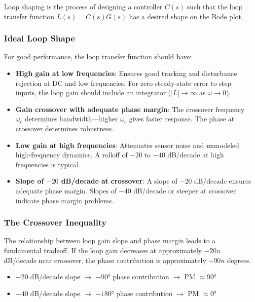 Loop shaping is the process of designing a controller $C(s)$ such that the loop transfer function $L(s) = C(s)G(s)$ has a desired shape on the Bode plot.

\subsubsection{Ideal Loop Shape}

For good performance, the loop transfer function should have:

\begin{itemize}
    \item \textbf{High gain at low frequencies}: Ensures good tracking and disturbance rejection at DC and low frequencies. For zero steady-state error to step inputs, the loop gain should include an integrator ($|L| \to \infty$ as $\omega \to 0$).

    \item \textbf{Gain crossover with adequate phase margin}: The crossover frequency $\omega_c$ determines bandwidth---higher $\omega_c$ gives faster response. The phase at crossover determines robustness.

    \item \textbf{Low gain at high frequencies}: Attenuates sensor noise and unmodeled high-frequency dynamics. A rolloff of $-20$ to $-40$ dB/decade at high frequencies is typical.

    \item \textbf{Slope of $-20$ dB/decade at crossover}: A slope of $-20$ dB/decade ensures adequate phase margin. Slopes of $-40$ dB/decade or steeper at crossover indicate phase margin problems.
\end{itemize}

\subsubsection{The Crossover Inequality}

The relationship between loop gain slope and phase margin leads to a fundamental tradeoff. If the loop gain decreases at approximately $-20n$ dB/decade near crossover, the phase contribution is approximately $-90n$ degrees.

\begin{itemize}
    \item $-20$ dB/decade slope $\rightarrow$ $-90°$ phase contribution $\rightarrow$ PM $\approx 90°$
    \item $-40$ dB/decade slope $\rightarrow$ $-180°$ phase contribution $\rightarrow$ PM $\approx 0°$
\end{itemize}

